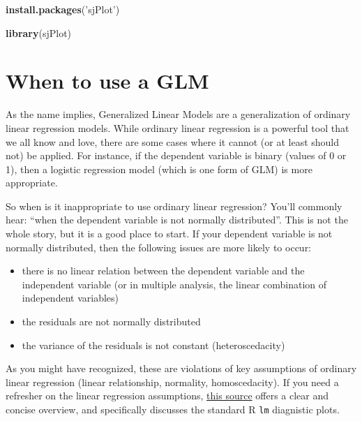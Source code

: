 \documentclass[
]{article}
\newenvironment{Shaded}{\begin{snugshade}}{\end{snugshade}}
\newcommand{\KeywordTok}[1]{\textcolor[rgb]{0.13,0.29,0.53}{\textbf{#1}}}
\newcommand{\NormalTok}[1]{#1}
\newcommand{\StringTok}[1]{\textcolor[rgb]{0.31,0.60,0.02}{#1}}
\providecommand{\tightlist}{%
  \setlength{\itemsep}{0pt}\setlength{\parskip}{0pt}}
\begin{document}
\begin{Shaded}
\begin{Highlighting}[]
\KeywordTok{install.packages}\NormalTok{(}\StringTok{'sjPlot'}\NormalTok{)}
\end{Highlighting}
\end{Shaded}

\begin{Shaded}
\begin{Highlighting}[]
\KeywordTok{library}\NormalTok{(sjPlot)}
\end{Highlighting}
\end{Shaded}

\hypertarget{when-to-use-a-glm}{%
\section{When to use a GLM}\label{when-to-use-a-glm}}

As the name implies, Generalized Linear Models are a generalization of
ordinary linear regression models. While ordinary linear regression is a
powerful tool that we all know and love, there are some cases where it
cannot (or at least should not) be applied. For instance, if the
dependent variable is binary (values of 0 or 1), then a logistic
regression model (which is one form of GLM) is more appropriate.

So when is it inappropriate to use ordinary linear regression? You'll
commonly hear: ``when the dependent variable is not normally
distributed''. This is not the whole story, but it is a good place to
start. If your dependent variable is not normally distributed, then the
following issues are more likely to occur:

\begin{itemize}
\tightlist
\item
  there is no linear relation between the dependent variable and the
  independent variable (or in multiple analysis, the linear combination
  of independent variables)
\item
  the residuals are not normally distributed
\item
  the variance of the residuals is not constant (heteroscedacity)
\end{itemize}

As you might have recognized, these are violations of key assumptions of
ordinary linear regression (linear relationship, normality,
homoscedacity). If you need a refresher on the linear regression
assumptions,
\href{http://sphweb.bumc.bu.edu/otlt/MPH-Modules/BS/R/R5_Correlation-Regression/R5_Correlation-Regression7.html}{this
source} offers a clear and concise overview, and specifically discusses
the standard R \texttt{lm} diagnistic plots.
\end{document}
